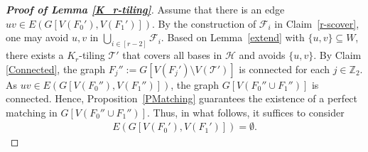 \documentclass[11pt, a4paper]{article}
\theoremstyle{definition}
\newcommand{\<}{\subseteq}
\begin{document}
\begin{proof}[\bf Proof of Lemma \ref{K_r-tiling}]
Assume that there is an edge $uv\in E(G[V(F_0'),V(F_1')])$. By the construction of $\mathcal{F}_i$ in Claim~\ref{r-scover}, one may avoid $u,v$ in $\bigcup_{i\in [r-2]}\mathcal{F}_i$. Based on Lemma~\ref{extend} with $\{u,v\}\subseteq W$, there exists a $K_r$-tiling $\mathcal{T}'$ that covers all bases in $\mathcal{H}$ and  avoids $\{u,v\}$. By Claim \ref{Connected}, the graph  $F_j'':=G[V(F_j')\setminus V(\mathcal{T}')]$ is connected for each $j\in \mathbb{Z}_2$. As $uv\in E(G[V(F_0''),V(F_1'')])$, the graph  $G[V(F_0''\cup F_1'')]$ is connected. Hence, Proposition~\ref{PMatching} guarantees the existence of a perfect matching in $G[V(F_0''\cup F_1'')]$. Thus, in what follows, it suffices to consider 
\begin{align*}%
E(G[V(F_0'),V(F_1')])=\emptyset.  
\end{align*}





\end{proof}
\end{document}

